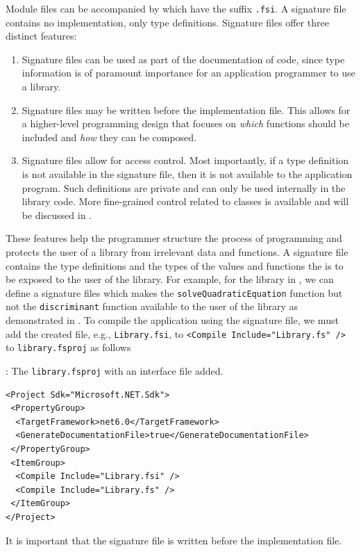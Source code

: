 \documentclass[fsharpNotes.tex]{subfiles}
\begin{document}
Module files can be accompanied by  which have the suffix \lstinline[language=console]{.fsi}. A signature file contains no implementation, only type definitions. Signature files offer three distinct features:
\begin{enumerate}
\item Signature files can be used as part of the documentation of code, since type information is of paramount importance for an application programmer to use a library. 
\item Signature files may be written before the implementation file. This allows for a higher-level programming design that focuses on \emph{which} functions should be included and \emph{how} they can be composed.
\item Signature files allow for access control. Most importantly, if a type definition is not available in the signature file, then it is not available to the application program. Such definitions are private and can only be used internally in the library code. More fine-grained control related to classes is available and will be discussed in .
\end{enumerate}
These features help the programmer structure the process of programming and protects the user of a library from irrelevant data and functions. A signature file contains the type definitions and the types of the values and functions the is to be exposed to the user of the library. For example, for the library in , we can define a signature files which makes the \lstinline{solveQuadraticEquation} function but not the \lstinline{discriminant} function available to the user of the library as demonstrated in .
To compile the application using the signature file, we must add the created file, e.g., \lstinline[language=console]{Library.fsi}, to \lstinline[language=console]{<Compile Include="Library.fs" />} to \lstinline[language=console]{library.fsproj} as follows
\begin{codeNOutput}[label=libraryFsprojFSI,
  top=-5pt,
  bottom=-5pt,
  left=-2pt,
  right=-2pt,
]{: The \texttt{library.fsproj} with an interface file added.}
  \begin{lstlisting}[language=console,escapechar=§]
<Project Sdk="Microsoft.NET.Sdk">
 <PropertyGroup>
  <TargetFramework>net6.0</TargetFramework>
  <GenerateDocumentationFile>true</GenerateDocumentationFile>
 </PropertyGroup>
 <ItemGroup>
  <Compile Include="Library.fsi" />
  <Compile Include="Library.fs" />
 </ItemGroup>
</Project>
\end{lstlisting}
\end{codeNOutput}
It is important that the signature file is written before the implementation file.
\end{document}
